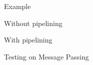 \documentclass[notes xcolor=dvipsnames]{beamer}
\begin{document}
    
    \begin{frame}{Example}

        Without pipelining
        \begin{figure}
        \end{figure}
             
        With pipelining
        \begin{figure}
        \end{figure}     
        
    \end{frame}

    \begin{frame}{Testing on Message Passing}

        \begin{figure}
        \end{figure}
        
    \end{frame}
\end{document}
